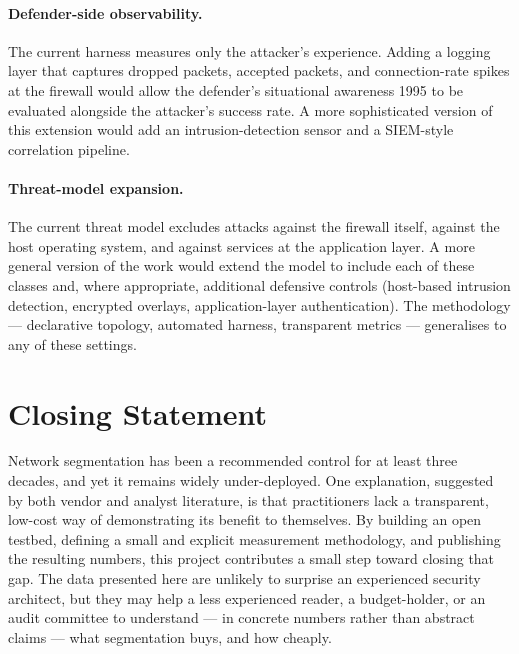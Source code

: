 \paragraph{Defender-side observability.} The current harness measures only the attacker's experience. Adding a logging layer that captures dropped packets, accepted packets, and connection-rate spikes at the firewall would allow the defender's situational awareness \parencite{Endsley}{1995} to be evaluated alongside the attacker's success rate. A more sophisticated version of this extension would add an intrusion-detection sensor and a SIEM-style correlation pipeline.

\paragraph{Threat-model expansion.} The current threat model excludes attacks against the firewall itself, against the host operating system, and against services at the application layer. A more general version of the work would extend the model to include each of these classes and, where appropriate, additional defensive controls (host-based intrusion detection, encrypted overlays, application-layer authentication). The methodology --- declarative topology, automated harness, transparent metrics --- generalises to any of these settings.

\section{Closing Statement}

Network segmentation has been a recommended control for at least three decades, and yet it remains widely under-deployed. One explanation, suggested by both vendor and analyst literature, is that practitioners lack a transparent, low-cost way of demonstrating its benefit to themselves. By building an open testbed, defining a small and explicit measurement methodology, and publishing the resulting numbers, this project contributes a small step toward closing that gap. The data presented here are unlikely to surprise an experienced security architect, but they may help a less experienced reader, a budget-holder, or an audit committee to understand --- in concrete numbers rather than abstract claims --- what segmentation buys, and how cheaply.
